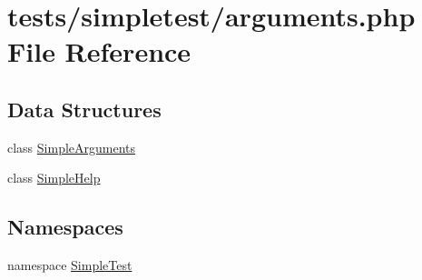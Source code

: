 \hypertarget{arguments_8php}{\section{tests/simpletest/arguments.php File Reference}
\label{arguments_8php}
}
\subsection*{Data Structures}
\begin{DoxyCompactItemize}
\item 
class \hyperlink{class_simple_arguments}{Simple\-Arguments}
\item 
class \hyperlink{class_simple_help}{Simple\-Help}
\end{DoxyCompactItemize}
\subsection*{Namespaces}
\begin{DoxyCompactItemize}
\item 
namespace \hyperlink{namespace_simple_test}{Simple\-Test}
\end{DoxyCompactItemize}

